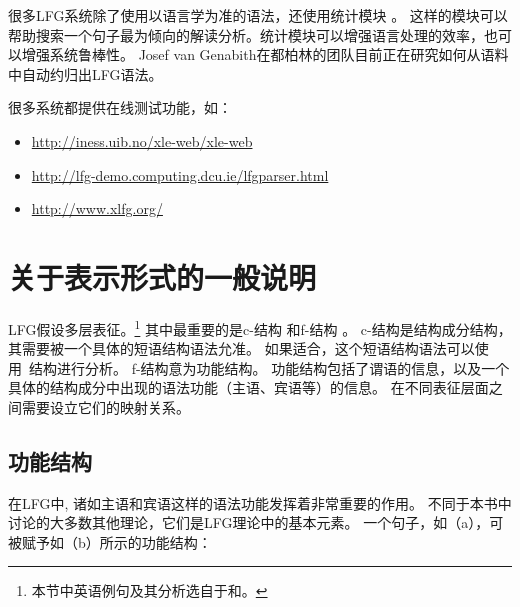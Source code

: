 很多LFG系统除了使用以语言学为准的语法，还使用统计模块
。
这样的模块可以帮助搜索一个句子最为倾向的解读分析。统计模块可以增强语言处理的效率，也可以增强系统鲁棒性\citep{KRKMVC2004a-u,RKKCMJ2002a-u}。
Josef van Genabith在都柏林的团队目前正在研究如何从语料中自动约归出LFG语法\citep{JGCCR99a-u,DBCGW2005a-u,CBFDRCW2005a-u,CG2006a-u,GWG2007a-u,CBDRGW2008a-u,SvG2009a-u}。

很多系统都提供在线测试功能，如：
\begin{itemize}
\item \url{http://iness.uib.no/xle-web/xle-web}

\item \url{http://lfg-demo.computing.dcu.ie/lfgparser.html}
\item \url{http://www.xlfg.org/}
\end{itemize}

\section{关于表示形式的一般说明}

\label{Abschnitt-Format-LFG}

LFG假设多层表征。\footnote{%
  本节中英语例句及其分析选自于\citet{Dalrymple2001a-u}和\citet{Dalrymple2006a}。
}
其中最重要的是c-结构
和f-结构
。
c-结构是结构成分结构，其需要被一个具体的短语结构语法允准。
如果适合，这个短语结构语法可以使用\xbarc~结构进行分析。
f-结构意为功能结构。
功能结构包括了谓语的信息，以及一个具体的结构成分中出现的语法功能（主语、宾语等）的信息。
在不同表征层面之间需要设立它们的映射关系。

\subsection{功能结构}

在LFG中, 诸如主语和宾语这样的语法功能发挥着非常重要的作用。
不同于本书中讨论的大多数其他理论，它们是LFG理论中的基本元素。
一个句子，如（a），可被赋予如（b）所示的功能结构：

\eal
{}
\ex {}
\zl

